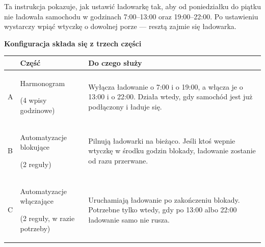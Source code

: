 \documentclass[11pt]{article}
\begin{document}

\vspace{0.1cm}
{\large\color{apink} Ta instrukcja pokazuje, jak ustawić ładowarkę tak, aby od poniedziałku do piątku nie ładowała samochodu w godzinach 7:00--13:00 oraz 19:00--22:00. Po ustawieniu wystarczy wpiąć wtyczkę o dowolnej porze — resztą zajmie się ładowarka.}


\vspace{0.2cm}
{\bfseries\color{apnavy}\large Konfiguracja składa się z trzech części}

\vspace{0.15cm}
\begin{tabularx}{\textwidth}{@{}p{0.5cm}p{4.6cm}X@{}}
\toprule
& \textbf{\color{apnavy}Część} & \textbf{\color{apnavy}Do czego służy}\\
\midrule
A & Harmonogram \par {\footnotesize (4 wpisy godzinowe)} & Wyłącza ładowanie o 7:00 i o 19:00, a włącza je o 13:00 i o 22:00. Działa wtedy, gdy samochód jest już podłączony i ładuje się.\\
B & Automatyzacje blokujące \par {\footnotesize (2 reguły)} & Pilnują ładowarki na bieżąco. Jeśli ktoś wepnie wtyczkę w środku godzin blokady, ładowanie zostanie od razu przerwane.\\
C & Automatyzacje włączające \par {\footnotesize (2 reguły, w razie potrzeby)} & Uruchamiają ładowanie po zakończeniu blokady. Potrzebne tylko wtedy, gdy po 13:00 albo 22:00 ładowanie samo nie rusza.\\
\bottomrule
\end{tabularx}

\end{document}
